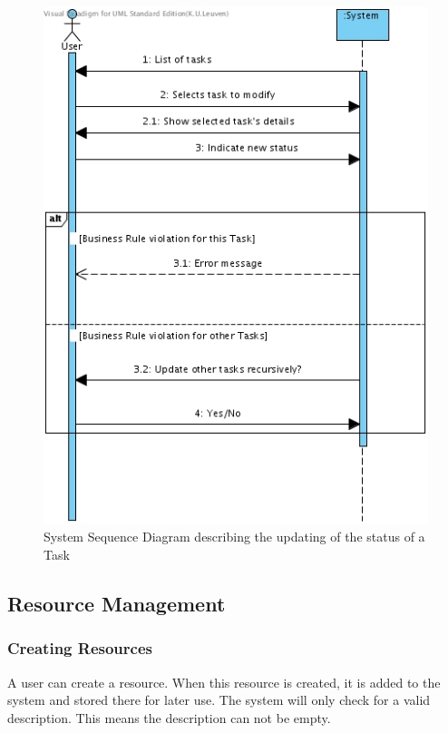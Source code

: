 			\begin{figure}[H]
				\begin{center}
					\includegraphics[scale=0.5]{images/ssd_update_task.jpg}
				\end{center}
				\caption{System Sequence Diagram describing the updating of the status of a Task}
			\end{figure}
		\subsection{Resource Management}
			\subsubsection{Creating Resources}
			A user can create a resource. When this resource is created, it is added to the system and stored there for later use.
			The system will only check for a valid description. This means the description can not be empty.

